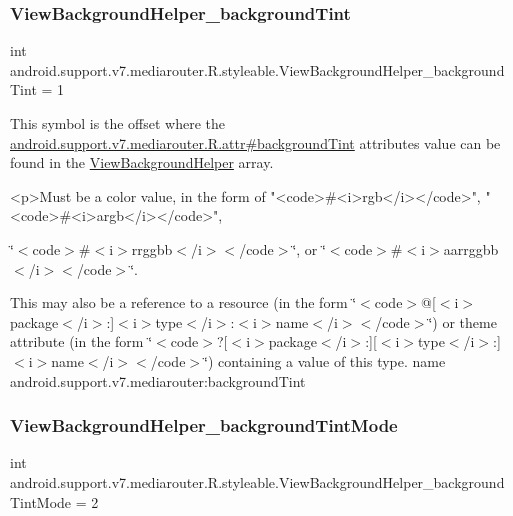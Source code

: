 \subsubsection{\texorpdfstring{View\+Background\+Helper\+\_\+background\+Tint}{ViewBackgroundHelper\_backgroundTint}}
{\footnotesize\ttfamily int android.\+support.\+v7.\+mediarouter.\+R.\+styleable.\+View\+Background\+Helper\+\_\+background\+Tint = 1\hspace{0.3cm}{\ttfamily [static]}}

This symbol is the offset where the \hyperlink{classandroid_1_1support_1_1v7_1_1mediarouter_1_1R_1_1attr_a3462fb05b26ddf9e114524febcf9fd1c}{android.\+support.\+v7.\+mediarouter.\+R.\+attr\#background\+Tint} attribute\textquotesingle{}s value can be found in the \hyperlink{classandroid_1_1support_1_1v7_1_1mediarouter_1_1R_1_1styleable_a65c1a920f4419d63dca1770bf1dd35ca}{View\+Background\+Helper} array.

\begin{DoxyVerb}      <p>Must be a color value, in the form of "<code>#<i>rgb</i></code>", "<code>#<i>argb</i></code>",
\end{DoxyVerb}
 \char`\"{}$<$code$>$\#$<$i$>$rrggbb$<$/i$>$$<$/code$>$\char`\"{}, or \char`\"{}$<$code$>$\#$<$i$>$aarrggbb$<$/i$>$$<$/code$>$\char`\"{}. 

This may also be a reference to a resource (in the form \char`\"{}$<$code$>$@\mbox{[}$<$i$>$package$<$/i$>$\+:\mbox{]}$<$i$>$type$<$/i$>$\+:$<$i$>$name$<$/i$>$$<$/code$>$\char`\"{}) or theme attribute (in the form \char`\"{}$<$code$>$?\mbox{[}$<$i$>$package$<$/i$>$\+:\mbox{]}\mbox{[}$<$i$>$type$<$/i$>$\+:\mbox{]}$<$i$>$name$<$/i$>$$<$/code$>$\char`\"{}) containing a value of this type.  name android.\+support.\+v7.\+mediarouter\+:background\+Tint \mbox{\label{classandroid_1_1support_1_1v7_1_1mediarouter_1_1R_1_1styleable_a61f31935344280c75bfeb7fe5e2b0794}} 
\subsubsection{\texorpdfstring{View\+Background\+Helper\+\_\+background\+Tint\+Mode}{ViewBackgroundHelper\_backgroundTintMode}}
{\footnotesize\ttfamily int android.\+support.\+v7.\+mediarouter.\+R.\+styleable.\+View\+Background\+Helper\+\_\+background\+Tint\+Mode = 2\hspace{0.3cm}{\ttfamily [static]}}


